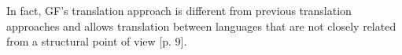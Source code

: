 In fact, GF's translation approach is different from previous translation approaches and allows translation between languages that are not closely related from a structural point of view \cite{enache:2013}[p. 9].

